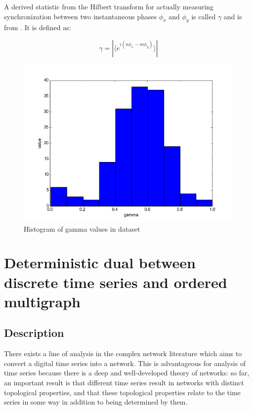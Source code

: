 \documentclass[12pt]{article}
\begin{document}

A derived statistic from the Hilbert transform for actually measuring synchronization between two instantaneous phases $\phi_x$ and $\phi_y$ is called $\gamma$ and is from \cite{gamma}. It is defined as:

$$ \gamma = |\langle e^{i(n\phi_x - m\phi_y)} \rangle| $$

\begin{figure}\label{fig:total_gammas}
  \begin{center}
    \includegraphics[scale=0.6]{total_gammas}
  \end{center}
  \caption{Histogram of gamma values in dataset}
\end{figure}

\section{Deterministic dual between discrete time series and ordered multigraph}

\subsection{Description}

There exists a line of analysis in the complex network literature which aims to convert a digital time series into a network. This is advantageous for analysis of time series because there is a deep and well-developed theory of networks: so far, an important result is that different time series result in networks with distinct topological properties, and that these topological properties relate to the time series in some way in addition to being determined by them\cite{campanharo}.
\end{document}
